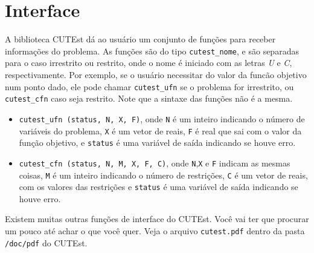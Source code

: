 \section{Interface}

A biblioteca CUTEst dá ao usuário um conjunto de funções para receber
informações do problema. As funções são do tipo \verb+cutest_nome+, e são separadas
para o caso irrestrito ou restrito, onde o nome é iniciado com as letras
\emph{U} e \emph{C}, respectivamente.  Por exemplo, se o usuário necessitar do
valor da funcão objetivo num ponto dado, ele pode chamar \verb+cutest_ufn+ se o
problema for irrestrito, ou \verb+cutest_cfn+ caso seja restrito. Note que a
sintaxe das funções não é a mesma.

\begin{itemize}
 \item \verb+cutest_ufn (status, N, X, F)+, onde \verb+N+ é um inteiro 
    indicando o número de  variáveis do problema, \verb+X+ é um vetor de reais,
    \verb+F+ é real que sai com o valor da função objetivo, e \verb+status+ é
    uma variável de saída indicando se houve erro.
 \item \verb+cutest_cfn (status, N, M, X, F, C)+, onde \verb+N+,\verb+X+ e
    \verb+F+ indicam as mesmas coisas, \verb+M+ é um inteiro indicando o número
    de restrições, \verb+C+ é um vetor de reais, com os valores das restrições 
    e \verb+status+ é uma variável de saída indicando se houve erro. 
\end{itemize}

Existem muitas outras funções de interface do CUTEst. Você vai ter que procurar
um pouco até achar o que você quer.
Veja o arquivo \verb+cutest.pdf+ dentro da pasta \verb+/doc/pdf+ do CUTEst.
